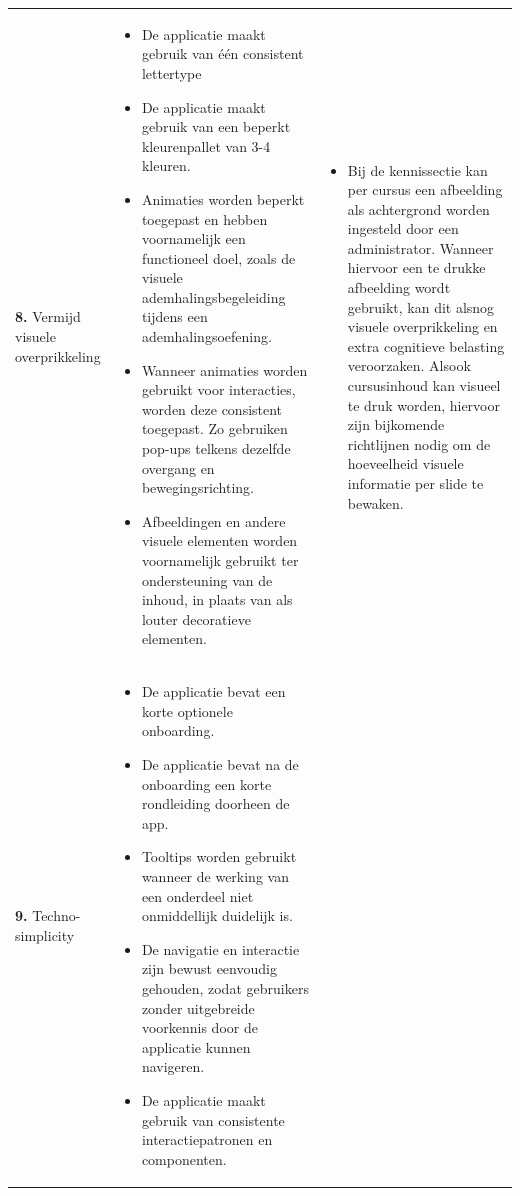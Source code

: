 {\begin{longtable}{
            >{\raggedright\arraybackslash}p{5.23cm}
            >{\raggedright\arraybackslash}p{4.93cm}
            >{\raggedright\arraybackslash}p{4.93cm}
        }
        \addlinespace[5pt]
        
        \textbf{8.} Vermijd visuele overprikkeling 
        &  
        \begin{itemize}[nosep,leftmargin=*,itemsep=10pt] 
            \renewcommand{\labelitemi}{+} 
            \item De applicatie maakt gebruik van één consistent lettertype
            \item De applicatie maakt gebruik van een beperkt kleurenpallet van 3-4 kleuren.
            \item Animaties worden beperkt toegepast en hebben voornamelijk een functioneel doel, zoals de visuele ademhalingsbegeleiding tijdens een ademhalingsoefening.
            \item Wanneer animaties worden gebruikt voor interacties, worden deze consistent toegepast. Zo gebruiken pop-ups telkens dezelfde overgang en bewegingsrichting.
            \item Afbeeldingen en andere visuele elementen worden voornamelijk gebruikt ter ondersteuning van de inhoud, in plaats van als louter decoratieve elementen.
        \end{itemize} 
        &  
        \begin{itemize}[nosep,leftmargin=*,itemsep=10pt] 
            \renewcommand{\labelitemi}{-} 
            \item Bij de kennissectie kan per cursus een afbeelding als achtergrond worden ingesteld door een administrator. Wanneer hiervoor een te drukke afbeelding wordt gebruikt, kan dit alsnog visuele overprikkeling en extra cognitieve belasting veroorzaken. Alsook cursusinhoud kan visueel te druk worden, hiervoor zijn bijkomende richtlijnen nodig om de hoeveelheid visuele informatie per slide te bewaken.
        \end{itemize} 
        \\
        
        \addlinespace[5pt]
        
        \textbf{9.} Techno-simplicity
        &  
        \begin{itemize}[nosep,leftmargin=*,itemsep=10pt] 
            \renewcommand{\labelitemi}{+} 
            \item De applicatie bevat een korte optionele onboarding.
            \item De applicatie bevat na de onboarding een korte rondleiding doorheen de app.
            \item Tooltips worden gebruikt wanneer de werking van een onderdeel niet onmiddellijk duidelijk is.
            \item De navigatie en interactie zijn bewust eenvoudig gehouden, zodat gebruikers zonder uitgebreide voorkennis door de applicatie kunnen navigeren.
            \item De applicatie maakt gebruik van consistente interactiepatronen en componenten.
        \end{itemize} 
        &
        \\
        

\end{longtable}}
